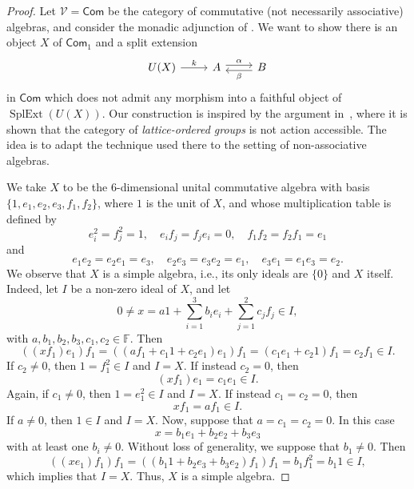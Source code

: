 \documentclass[reqno,a4paper]{amsart}
\theoremstyle{plain}
\theoremstyle{definition}
\theoremstyle{remark}
\numberwithin{equation}{section}
\newcommand{\F}{\mathbb{F}}
\newcommand{\V}{\mathcal{V}}
\DeclareMathOperator{\SplExt}{SplExt}
\newcommand{\Com}{\ensuremath{\mathsf{Com}}}
\begin{document}
\begin{proof}
Let $\V=\Com$ be the category of commutative (not necessarily associative) algebras, and consider the monadic adjunction of . We want to show there is an object $X$ of $\Com_1$ and a split extension
\[
\begin{tikzcd}
U(X) \arrow [r, "k"]
& A \arrow[r, shift left, "\alpha"] &
B \ar[l, shift left, "\beta"]
\end{tikzcd}    
\]
in $\Com$ which does not admit any morphism into a faithful object of $\SplExt(U(X))$. Our construction is inspired by the argument in~\cite[Proposition 6.4]{Cappelletti}, where it is shown that the category of \emph{lattice-ordered groups} is not action accessible. The idea is to adapt the technique used there to the setting of non-associative algebras.  

We take $X$ to be the $6$-dimensional unital commutative algebra with basis $\{ 1,e_1,e_2,e_3,f_1,f_2 \}$, where $1$ is the unit of $X$, and whose multiplication table is defined by
\[
e_i^2=f_j^2=1, \quad e_if_j=f_je_i=0, \quad f_1 f_2 = f_2 f_1=e_1
\]
and
\[
e_1 e_2 = e_2 e_1=e_3, \quad e_2e_3=e_3e_2=e_1, \quad e_3e_1=e_1e_3=e_2.
\]
We observe that $X$ is a simple algebra, i.e., its only ideals are $\{ 0 \}$ and $X$ itself. Indeed, let $I$ be a non-zero ideal of $X$, and let 
\[
0 \neq x=a1+\sum_{i=1}^3 b_i e_i + \sum_{j=1}^2 c_j f_j \in I,
\]
with $a,b_1,b_2,b_3,c_1,c_2 \in \F$. Then
\[
((xf_1)e_1)f_1=((af_1+c_1 1+c_2e_1)e_1)f_1=(c_1e_1+c_2 1)f_1=c_2f_1 \in I.
\]
If $c_2 \neq 0$, then $1=f_1^2 \in I$ and $I=X$. If instead $c_2=0$, then
\[
(x f_1)e_1=c_1 e_1 \in I.
\]
Again, if $c_1 \neq 0$, then $1=e_1^2 \in I$ and $I=X$. If instead $c_1=c_2=0$, then
\[
x f_1=a f_1 \in I.
\]
If $a \neq 0$, then $1 \in I$ and $I=X$. Now, suppose that $a=c_1=c_2=0$. In this case
\[
x=b_1 e_1 + b_2 e_2 + b_3 e_3
\]
with at least one $b_i \neq 0$. Without loss of generality, we suppose that $b_1 \neq 0$. Then 
\[
((xe_1)f_1)f_1=((b_1 1 + b_2 e_3 + b_3 e_2)f_1)f_1=b_1f_1^2=b_1 1\in I,
\]
which implies that $I=X$. Thus, $X$ is a simple algebra.


\end{proof}
\end{document}
